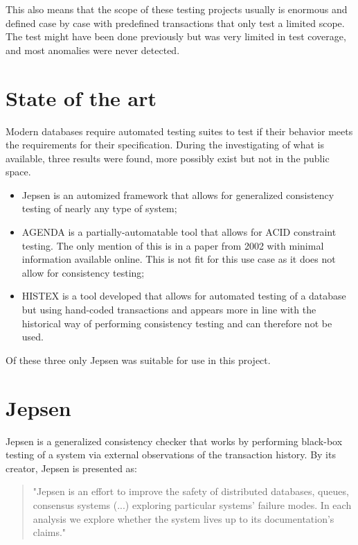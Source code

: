 \documentclass[a4paper,10pt,titlepage]{report}
\begin{document}
This also means that the scope of these testing projects usually is enormous and defined case by case with predefined transactions that only test a limited scope. The test might have been done previously but was very limited in test coverage, and most anomalies were never detected.

\section{State of the art}

Modern databases require automated testing suites to test if their behavior meets the requirements for their specification. During the investigating of what is available, three results were found, more possibly exist but not in the public space.
\begin{itemize}
\item Jepsen is an automized framework that allows for generalized consistency testing of nearly any type of system;
\item AGENDA \cite{AGENDA} is a partially-automatable tool that allows for ACID constraint testing. The only mention of this is in a paper from 2002 with minimal information available online. This is not fit for this use case as it does not allow for consistency testing;
\item HISTEX \cite{HISTEX} is a tool developed that allows for automated testing of a database but using hand-coded transactions and appears more in line with the historical way of performing consistency testing and can therefore not be used.
\end{itemize}

Of these three only Jepsen was suitable for use in this project.

\section{Jepsen}
Jepsen is a generalized consistency checker that works by performing black-box testing of a system via external observations of the transaction history. By its creator, Jepsen is presented as:
\begin{quote}
    "Jepsen is an effort to improve the safety of distributed databases, queues, consensus systems  (...) exploring particular systems' failure modes. In each analysis we explore whether the system lives up to its documentation's claims." \cite{jepsonio}
\end{quote}

\vspace{5mm}
\end{document}
